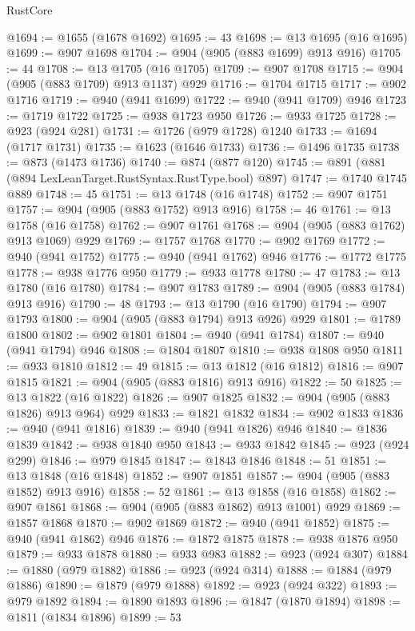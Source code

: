 \begin{lexlean}{RustCore}
\begin{coremodule}
@1694 := @1655 (@1678 @1692)
@1695 := 43
@1698 := @13 @1695 (@16 @1695)
@1699 := @907 @1698
@1704 := @904 (@905 (@883 @1699) @913 @916)
@1705 := 44
@1708 := @13 @1705 (@16 @1705)
@1709 := @907 @1708
@1715 := @904 (@905 (@883 @1709) @913 @1137) @929
@1716 := @1704 @1715
@1717 := @902 @1716
@1719 := @940 (@941 @1699)
@1722 := @940 (@941 @1709) @946
@1723 := @1719 @1722
@1725 := @938 @1723 @950
@1726 := @933 @1725
@1728 := @923 (@924 @281)
@1731 := @1726 (@979 @1728) @1240
@1733 := @1694 (@1717 @1731)
@1735 := @1623 (@1646 @1733)
@1736 := @1496 @1735
@1738 := @873 (@1473 @1736)
@1740 := @874 (@877 @120)
@1745 := @891 (@881 (@894 LexLeanTarget.RustSyntax.RustType.bool) @897)
@1747 := @1740 @1745 @889
@1748 := 45
@1751 := @13 @1748 (@16 @1748)
@1752 := @907 @1751
@1757 := @904 (@905 (@883 @1752) @913 @916)
@1758 := 46
@1761 := @13 @1758 (@16 @1758)
@1762 := @907 @1761
@1768 := @904 (@905 (@883 @1762) @913 @1069) @929
@1769 := @1757 @1768
@1770 := @902 @1769
@1772 := @940 (@941 @1752)
@1775 := @940 (@941 @1762) @946
@1776 := @1772 @1775
@1778 := @938 @1776 @950
@1779 := @933 @1778
@1780 := 47
@1783 := @13 @1780 (@16 @1780)
@1784 := @907 @1783
@1789 := @904 (@905 (@883 @1784) @913 @916)
@1790 := 48
@1793 := @13 @1790 (@16 @1790)
@1794 := @907 @1793
@1800 := @904 (@905 (@883 @1794) @913 @926) @929
@1801 := @1789 @1800
@1802 := @902 @1801
@1804 := @940 (@941 @1784)
@1807 := @940 (@941 @1794) @946
@1808 := @1804 @1807
@1810 := @938 @1808 @950
@1811 := @933 @1810
@1812 := 49
@1815 := @13 @1812 (@16 @1812)
@1816 := @907 @1815
@1821 := @904 (@905 (@883 @1816) @913 @916)
@1822 := 50
@1825 := @13 @1822 (@16 @1822)
@1826 := @907 @1825
@1832 := @904 (@905 (@883 @1826) @913 @964) @929
@1833 := @1821 @1832
@1834 := @902 @1833
@1836 := @940 (@941 @1816)
@1839 := @940 (@941 @1826) @946
@1840 := @1836 @1839
@1842 := @938 @1840 @950
@1843 := @933 @1842
@1845 := @923 (@924 @299)
@1846 := @979 @1845
@1847 := @1843 @1846
@1848 := 51
@1851 := @13 @1848 (@16 @1848)
@1852 := @907 @1851
@1857 := @904 (@905 (@883 @1852) @913 @916)
@1858 := 52
@1861 := @13 @1858 (@16 @1858)
@1862 := @907 @1861
@1868 := @904 (@905 (@883 @1862) @913 @1001) @929
@1869 := @1857 @1868
@1870 := @902 @1869
@1872 := @940 (@941 @1852)
@1875 := @940 (@941 @1862) @946
@1876 := @1872 @1875
@1878 := @938 @1876 @950
@1879 := @933 @1878
@1880 := @933 @983
@1882 := @923 (@924 @307)
@1884 := @1880 (@979 @1882)
@1886 := @923 (@924 @314)
@1888 := @1884 (@979 @1886)
@1890 := @1879 (@979 @1888)
@1892 := @923 (@924 @322)
@1893 := @979 @1892
@1894 := @1890 @1893
@1896 := @1847 (@1870 @1894)
@1898 := @1811 (@1834 @1896)
@1899 := 53

\end{coremodule}
\end{lexlean}
